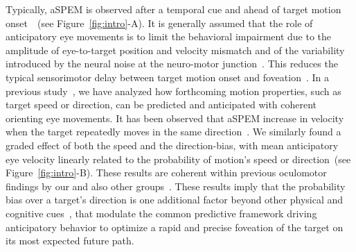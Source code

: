 \documentclass[profile,final,english, draft]{article}%
\newcommand{\citep}[1]{\parencite{#1}}
\newcommand{\seeFig}[1]{see Figure~\ref{fig:#1}}
\begin{document}
Typically, aSPEM is observed after a temporal cue and
ahead of target motion onset~\citep{Kowler1979a,Kowler1979b, Kowler1984}~(\seeFig{intro}-A).
It is generally assumed that the role of anticipatory eye movements is
to limit the behavioral impairment due
to the amplitude of eye-to-target position and velocity mismatch and
of the variability introduced by the neural noise 
at the neuro-motor junction~\citep{WolpertXXX}.
This reduces the typical sensorimotor delay
between target motion onset and foveation~\citep{PerrinetAdamasFriston2014}.
In a previous study~\citep{SoutoMontagniniMasson2008,Montagnini2010},
we have analyzed how forthcoming motion properties,
such as target speed or direction, can be
predicted and anticipated with coherent orienting eye movements.
It has been observed that aSPEM increase in velocity
when the target repeatedly moves in the same direction~\citep{Kowler1984, Kowler1989, Heinen2005}.
We similarly found a graded effect of both the speed and the direction-bias,
with mean anticipatory eye velocity
linearly related to the probability of motion's speed or direction~(\seeFig{intro}-B).
These results are coherent within previous oculomotor findings
by our and also other groups~\citep{SantosKowler2017}.
These results imply that the probability bias over a target's direction is
one additional factor beyond other physical and cognitive cues~\citep{Kowler2014, SantosKowler2017},
that modulate the common predictive framework
driving anticipatory behavior to optimize a rapid and
precise foveation of the target on its most expected future path.
\end{document}
